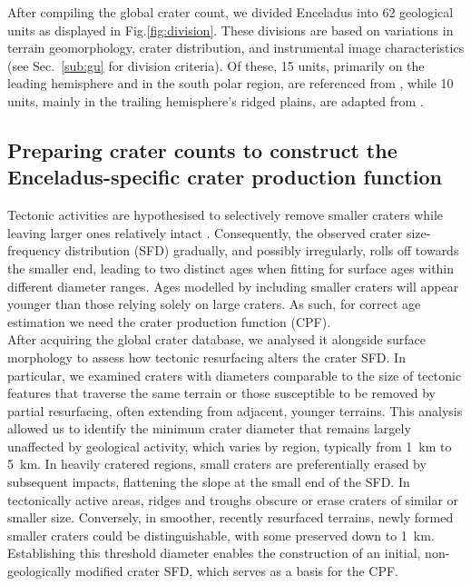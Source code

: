 \documentclass[preprint,12pt,3p,times,authoryear]{elsarticle}
\begin{document}
After compiling the global crater count, we divided Enceladus into 62 geological units as displayed in  Fig.\ref{fig:division}. These divisions are based on variations in terrain geomorphology, crater distribution, and instrumental image characteristics (see Sec.~\ref{sub:gu} for division criteria).
Of these, 15 units, primarily on the leading hemisphere and in the south polar region, are referenced from \citet{CrowWillard2015}, while 10 units, mainly in the trailing hemisphere’s ridged plains, are adapted from \citet{Kirchoff2009}. \\


\subsection{Preparing crater counts to construct the Enceladus-specific crater production function}
\label{subsec:cpf}
Tectonic activities are hypothesised to selectively remove smaller craters while leaving larger ones relatively intact \citep{Michael2010}. Consequently, the observed crater size-frequency distribution (SFD) gradually, and possibly irregularly, rolls off towards the smaller end, leading to two distinct ages when fitting for surface ages within different diameter ranges. Ages modelled by including smaller craters will appear younger than those relying solely on large craters. As such, for correct age estimation we need the crater production function (CPF).\\

After acquiring the global crater database, we analysed it alongside surface morphology to assess how tectonic resurfacing alters the crater SFD. In particular, we examined craters with diameters comparable to the size of tectonic features that traverse the same terrain or those susceptible to be removed by partial resurfacing, often extending from adjacent, younger terrains. This analysis allowed us to identify the minimum crater diameter that remains largely unaffected by geological activity, which varies by region, typically from 1~km to 5~km. In heavily cratered regions, small craters are preferentially erased by subsequent impacts, flattening the slope at the small end of the SFD. In tectonically active areas, ridges and troughs obscure or erase craters of similar or smaller size. Conversely, in smoother, recently resurfaced terrains, newly formed smaller craters could be distinguishable, with some preserved down to 1~km. Establishing this threshold diameter enables the construction of an initial, non-geologically modified crater SFD, which serves as a basis for the CPF.\\
\end{document}
